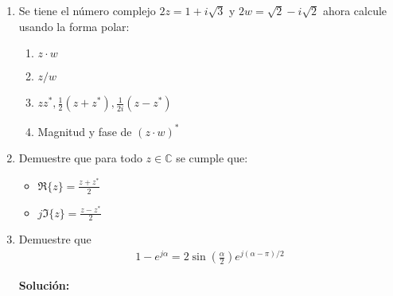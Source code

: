 \documentclass[letterpaper, 12pt]{article}
\newif\ifanswers
\begin{document}
\begin{enumerate}



    \item Se tiene el número complejo $2z = 1 +i\sqrt{3}$ y $2w = \sqrt{2}-i\sqrt{2}$ ahora calcule usando la forma polar:
    \begin{enumerate}
        \item $z\cdot w$
        \item $z/w$
        \item $zz^{*},\frac{1}{2} (z + z^{*}), \frac{1}{2i} (z - z^{*})$
        \item Magnitud y fase de $(z\cdot w)^{*}$
    \end{enumerate}
    \ifanswers
    {\color{red} \textbf{Solución:} \textit{Resuelta en ayudantía}}
    \fi
    

    \item Demuestre que para todo $z \in \mathbb{C}$  se cumple que:
    \begin{itemize}
        \item $\Re{\{z\}} = \frac{z + z^*}{2}$
        \item $j\Im{\{z\}}  = \frac{z-z^*}{2}$
    \end{itemize}

    \ifanswers
    {\color{red}\textbf{Solución:} 

    
    Tomamos un complejo cualquiera $z = \sigma + j \omega$\\
    $$z + z^* = \sigma + j\omega + \sigma -j\omega = 2\sigma $$
    $$\frac{z + z^*}{2} = \sigma$$
    Similarmente:
    $$z-z^* = \sigma +j\omega - \sigma + j\omega = 2j\omega$$
    $$\frac{z - z^*}{2} = j \omega$$}
    \fi

    \item Demuestre que 
    \begin{align*}
        1-e^{j\alpha} = 2\sin \left(\frac{\alpha}{2}\right)e^{j(\alpha-\pi)/2}
    \end{align*}
    
    \ifanswers
    {\color{red} \textbf{Solución:}

}
\end{enumerate}
\end{document}
